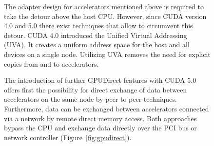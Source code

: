 \begin{figure}[H]
\noindent The adapter design for accelerators mentioned above 
is required to take the detour above the host CPU. However, since CUDA version 4.0 and 5.0 there exist
techniques that allow to circumvent this detour. CUDA 4.0 introduced the Unified
Virtual Addressing (UVA).  It creates a uniform address space for the
host and all devices on a single node. Utilizing UVA removes the need for
explicit copies from and to accelerators.

The introduction of further GPUDirect features with CUDA 5.0 offers
first the possibility for direct exchange of data between accelerators
on the same node by peer-to-peer techniques.  Furthermore, data
can be exchanged between accelerators connected via a network by
remote direct memory access.  Both approaches bypass the CPU
and exchange data directly over the PCI bus or network controller
(Figure~\ref{fig:gpudirect}).



\end{figure}




